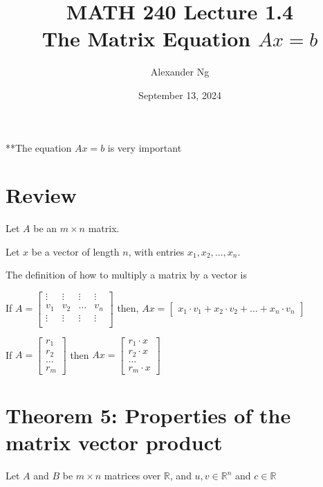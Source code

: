 \documentclass[12pt]{article}
\begin{document}
\title{MATH 240 Lecture 1.4\\The Matrix Equation $Ax=b$}
\author{Alexander Ng}
\date{September 13, 2024}

\maketitle

**The equation $Ax=b$ is very important

\section*{Review}

Let $A$ be an $m \times n$ matrix.

Let $x$ be a vector of length $n$, with entries $x_{1}, x_{2}, \dots, x_{n}$.

The definition of how to multiply a matrix by a vector is

If $
  A=\begin{bmatrix}
    \vdots & \vdots & \vdots & \vdots \\
    v_{1} & v_{2} & \dots & v_{n} \\
    \vdots & \vdots & \vdots & \vdots \\
  \end{bmatrix}
$ then, $
  Ax = \begin{bmatrix}
    x_1 \cdot v_{1} + x_2 \cdot v_{2} + \dots + x_n \cdot v_{n}
  \end{bmatrix}
$

If $
  A=\begin{bmatrix}
    r_1\\r_2\\ 
    \dots
    \\r_m
  \end{bmatrix}
$ then $
  Ax = \begin{bmatrix}
    r_1 \cdot x\\
    r_2 \cdot x\\
    \dots\\
    r_m \cdot x
  \end{bmatrix}
$

\pagebreak
\section{Theorem 5: Properties of the matrix vector product}

Let $A$ and $B$ be $m \times n$ matrices over $\mathbb{R}$, and 
$u,v \in \mathbb{R}^{n}$ and $c\in\mathbb{R}$
\end{document}

